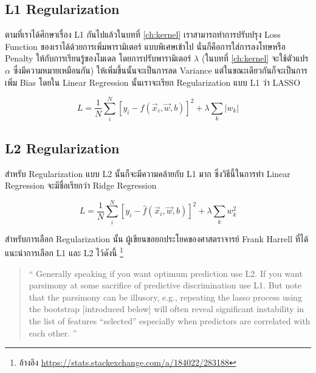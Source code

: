 \subsection{L1 Regularization}

ตามที่เราได้ศึกษาเรื่อง L1 กันไปแล้วในบทที่ \ref{ch:kernel} เราสามารถทำการปรับปรุง Loss Function ของเราได้ด้วยการเพิ่มพารามิเตอร์%
แบบพิเศษเข้าไป นั่นก็คือการใส่การลงโทษหรือ Penalty ให้กับการเรียนรู้ของโมเดล โดยการปรับพารามิเตอร์ $\lambda$ (ในบทที่ \ref{ch:kernel}
จะใช้ตัวแปร $\alpha$ ซึ่งมีความหมายเหมือนกัน) ให้เพิ่มขึ้นนั้นจะเป็นการลด Variance แต่ในขณะเดียวกันก็จะเป็นการเพิ่ม Bias โดยใน 
Linear Regression นั้นเราจะเรียก Regularization แบบ L1 ว่า LASSO

\begin{equation}
    L = \frac{1}{N}\sum_i^N \left[y_i - \hat{f}(\vec{x}_i, \vec{w}, b)\right]^2 + \lambda \sum_k \left|w_k\right|
\end{equation}

\subsection{L2 Regularization}

สำหรับ Regularization แบบ L2 นั้นก็จะมีความคล้ายกับ L1 มาก ซึ่งวิธีนี้ในการทำ Linear Regression จะมีชื่อเรียกว่า Ridge Regression

\begin{equation}
    L = \frac{1}{N}\sum_i^N \left[y_i - \hat{f}(\vec{x}_i, \vec{w}, b)\right]^2 + \lambda \sum_k w_k^2
\end{equation}

สำหรับการเลือก Regularization นั้น ผู้เขียนขอยกประโยคของศาสตราจารย์ Frank Harrell ที่ได้แนะนำการเลือก L1 และ L2 ไว้ดังนี้
\footnote{อ้างอิง \url{https://stats.stackexchange.com/a/184022/283188}}

\blockquote{\enquote{
    Generally speaking if you want optimum prediction use L2. 
    If you want parsimony at some sacrifice of predictive discrimination use L1. 
    But note that the parsimony can be illusory, e.g., repeating the lasso process 
    using the bootstrap [introduced below] will often reveal significant instability 
    in the list of features “selected” especially when predictors are correlated with each other.
}
}
